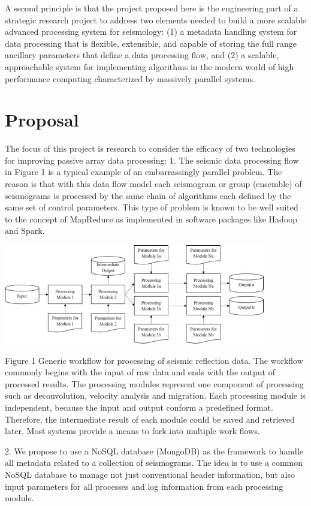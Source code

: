 \documentclass{acm_proc_article-sp}
\begin{document}
A second principle is that the project proposed here is the engineering part of a strategic research project to address two elements needed to build a more scalable advanced processing system for seismology: (1) a metadata handling system for data processing that is flexible, extensible, and capable of storing the full range ancillary parameters that define a data processing flow, and (2) a scalable, approachable system for implementing algorithms in the modern world of high performance computing characterized by massively parallel systems.


\section{Proposal}

The focus of this project is research to consider the efficacy of two technologies for improving passive array data processing:
1.	The seismic data processing flow in Figure 1 is a typical example of an embarrassingly parallel problem.  The reason is that with this data flow model each seismogram or group (ensemble) of seismograms is processed by the same chain of algorithms each defined by the same set of control parameters.  This type of problem is known to be well suited to the concept of MapReduce as implemented in software packages like Hadoop and Spark.  

\includegraphics[scale=0.5]{Picture1}

Figure 1 Generic workflow for processing of seismic reflection data.  The workflow commonly begins with the input of raw data and ends with the output of processed results.  The processing modules represent one component of processing such as deconvolution, velocity analysis and migration.  Each processing module is independent, because the input and output conform a predefined format.  Therefore, the intermediate result of each module could be saved and retrieved later.  Most systems provide a means to fork into multiple work flows.  

2.	We propose to use a NoSQL database (MongoDB) as the framework to handle all metadata related to a collection of seismograms.  The idea is to use a common NoSQL database to manage not just conventional header information, but also input parameters for all processes and log information from each processing module. 
\end{document}
